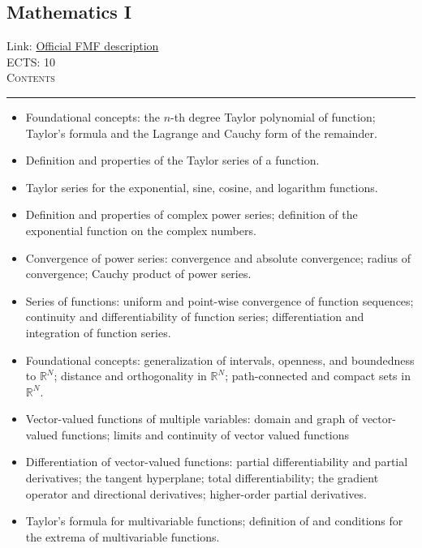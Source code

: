 \documentclass[11pt, a4paper]{article}
\newenvironment{course}[3]{
\subsection{#1}%
Link: \href{#2}{Official FMF description}\\%
ECTS: #3%
\vspace{1ex}
\\
{\large \textsc{Contents}}\\[-0.9ex]%
\rule{\textwidth}{0.5pt}
\vspace{-3ex}
}
{}
\newenvironment{chapter}[1]{
\begin{tcolorbox}[title=#1, breakable]
}
{\end{tcolorbox}}
\begin{document}
\begin{course}{Mathematics I}{https://www.fmf.uni-lj.si/en/study-physics/programmes/1fiz/2020/7000777/courses/520/}{10}
\begin{chapter}{Taylor and power series}
\begin{itemize}
            \item Foundational concepts: the $ n $-th degree Taylor polynomial of function; Taylor's formula and the Lagrange and Cauchy form of the remainder.

            \item Definition and properties of the Taylor series of a function.

            \item Taylor series for the exponential, sine, cosine, and logarithm functions.

            \item Definition and properties of complex power series; definition of the exponential function on the complex numbers.

            \item Convergence of power series: convergence and absolute convergence; radius of convergence; Cauchy product of power series.

            \item Series of functions: uniform and point-wise convergence of function sequences; continuity and differentiability of function series; differentiation and integration of function series.
        
        \end{itemize}
    \end{chapter}

    \begin{chapter}{Higher-dimensional Euclidean space}
        \begin{itemize}
        
            \item Foundational concepts: generalization of intervals, openness, and boundedness to $ \mathbb{R}^{N} $; distance and orthogonality in $ \mathbb{R}^{N} $; path-connected and compact sets in $ \mathbb{R}^{N} $.

            \item Vector-valued functions of multiple variables: domain and graph of vector-valued functions; limits and continuity of vector valued functions

            \item Differentiation of vector-valued functions: partial differentiability and partial derivatives; the tangent hyperplane; total differentiability; the gradient operator and directional derivatives; higher-order partial derivatives.

            \item Taylor's formula for multivariable functions; 
            definition of and conditions for the extrema of multivariable functions.
        
        \end{itemize}
    \end{chapter}
\end{course}
\end{document}
